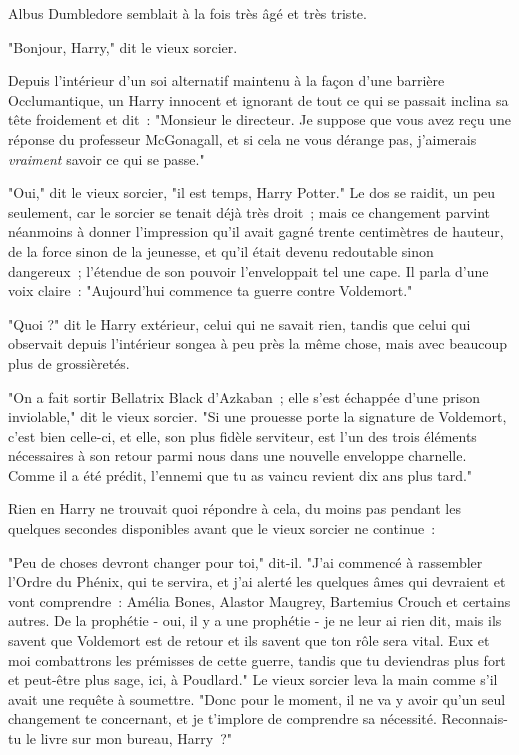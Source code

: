 Albus Dumbledore semblait à la fois très âgé et très triste.

"Bonjour, Harry," dit le vieux sorcier.

Depuis l'intérieur d'un soi alternatif maintenu à la façon d'une barrière Occlumantique, un Harry innocent et ignorant de tout ce qui se passait inclina sa tête froidement et dit~: "Monsieur le directeur. Je suppose que vous avez reçu une réponse du professeur McGonagall, et si cela ne vous dérange pas, j'aimerais \emph{vraiment} savoir ce qui se passe."

"Oui," dit le vieux sorcier, "il est temps, Harry Potter." Le dos se raidit, un peu seulement, car le sorcier se tenait déjà très droit~; mais ce changement parvint néanmoins à donner l'impression qu'il avait gagné trente centimètres de hauteur, de la force sinon de la jeunesse, et qu'il était devenu redoutable sinon dangereux~; l'étendue de son pouvoir l'enveloppait tel une cape. Il parla d'une voix claire~: "Aujourd'hui commence ta guerre contre Voldemort."

"Quoi ?" dit le Harry extérieur, celui qui ne savait rien, tandis que celui qui observait depuis l'intérieur songea à peu près la même chose, mais avec beaucoup plus de grossièretés.

"On a fait sortir Bellatrix Black d'Azkaban~; elle s'est échappée d'une prison inviolable," dit le vieux sorcier. "Si une prouesse porte la signature de Voldemort, c'est bien celle-ci, et elle, son plus fidèle serviteur, est l'un des trois éléments nécessaires à son retour parmi nous dans une nouvelle enveloppe charnelle. Comme il a été prédit, l'ennemi que tu as vaincu revient dix ans plus tard."

Rien en Harry ne trouvait quoi répondre à cela, du moins pas pendant les quelques secondes disponibles avant que le vieux sorcier ne continue~:

"Peu de choses devront changer pour toi," dit-il. "J'ai commencé à rassembler l'Ordre du Phénix, qui te servira, et j'ai alerté les quelques âmes qui devraient et vont comprendre~: Amélia Bones, Alastor Maugrey, Bartemius Crouch et certains autres. De la prophétie - oui, il y a une prophétie - je ne leur ai rien dit, mais ils savent que Voldemort est de retour et ils savent que ton rôle sera vital. Eux et moi combattrons les prémisses de cette guerre, tandis que tu deviendras plus fort et peut-être plus sage, ici, à Poudlard." Le vieux sorcier leva la main comme s'il avait une requête à soumettre. "Donc pour le moment, il ne va y avoir qu'un seul changement te concernant, et je t'implore de comprendre sa nécessité. Reconnais-tu le livre sur mon bureau, Harry~?"

